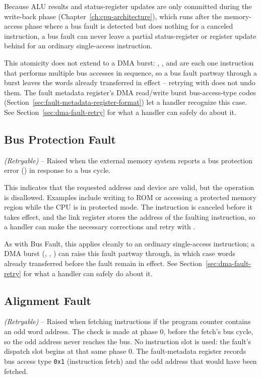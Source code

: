 Because ALU results and status-register updates are only committed during the write-back phase
(Chapter~\ref{ch:cpu-architecture}), which runs after the memory-access phase where a bus fault is detected but does
nothing for a canceled instruction, a bus fault can never leave a partial status-register or register update behind for
an ordinary single-access instruction.

This atomicity does not extend to a DMA burst: , , and  are each one
instruction that performs multiple bus accesses in sequence, so a bus fault partway through a burst leaves the words
already transferred in effect -- retrying with  does not undo them. The fault metadata register's DMA
read/write burst bus-access-type codes (Section~\ref{sec:fault-metadata-register-format}) let a handler recognize this
case. See Section~\ref{sec:dma-fault-retry} for what a handler can safely do about it.

\subsection{Bus Protection Fault}
\label{sec:bus-protection-fault}

\textit{(Retryable)} -- Raised when the external memory system reports a bus protection error () in response to a bus
cycle.

This indicates that the requested address and device are valid, but the operation is disallowed. Examples include
writing to ROM or accessing a protected memory region while the CPU is in protected mode. The instruction is canceled
before it takes effect, and the link register stores the address of the faulting instruction, so a handler can make the
necessary corrections and retry with .

As with Bus Fault, this applies cleanly to an ordinary single-access instruction; a DMA burst (,
, ) can raise this fault partway through, in which case words already transferred before
the fault remain in effect. See Section~\ref{sec:dma-fault-retry} for what a handler can safely do about it.

\subsection{Alignment Fault}
\label{sec:alignment-fault}

\textit{(Retryable)} -- Raised when fetching instructions if the program counter
contains an odd word address. The check is made at phase 0, before the fetch's bus cycle, so the odd address never
reaches the bus. No instruction slot is used: the fault's dispatch slot begins at that same phase 0. The fault-metadata
register records bus access type \texttt{0x1} (instruction fetch) and the odd address that would have been fetched.

